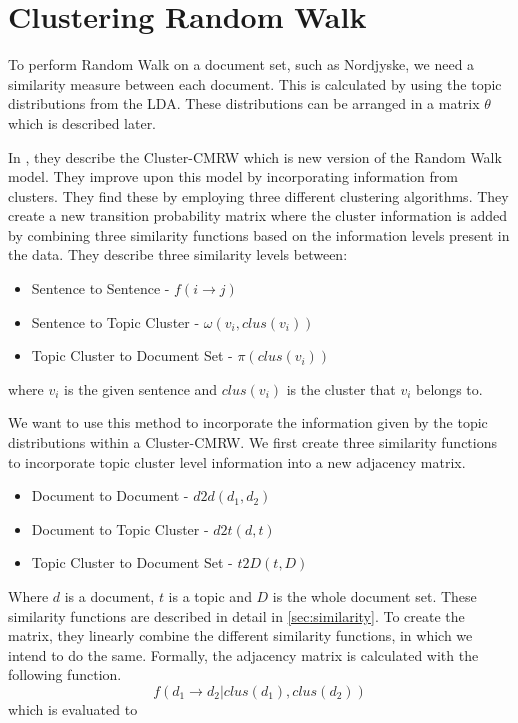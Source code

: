 \section{Clustering Random Walk}
To perform Random Walk on a document set, such as Nordjyske, we need a similarity measure between each document.
This is calculated by using the topic distributions from the \gls{LDA}.
These distributions can be arranged in a matrix $\theta$ which is described later.

In \cite{ClusterPageRank}, they describe the \gls{Cluster-CMRW} which is new version of the Random Walk model. 
They improve upon this model by incorporating information from clusters. 
They find these by employing three different clustering algorithms.
They create a new transition probability matrix where the cluster information is added by combining three similarity functions based on the information levels present in the data.
They describe three similarity levels between:
\begin{itemize}
    \item Sentence to Sentence - $f(i \rightarrow j)$
    \item Sentence to Topic Cluster - $\omega(v_i, clus(v_i))$
    \item Topic Cluster to Document Set - $\pi(clus(v_i))$
\end{itemize}
where $v_i$ is the given sentence and $clus(v_i)$ is the cluster that $v_i$ belongs to.

We want to use this method to incorporate the information given by the topic distributions within a \gls{Cluster-CMRW}. 
We first create three similarity functions to incorporate topic cluster level information into a new adjacency matrix.
\begin{itemize}
    \item Document to Document - $d2d(d_1, d_2)$
    \item Document to Topic Cluster - $d2t(d,t)$
    \item Topic Cluster to Document Set - $t2D(t, D)$
\end{itemize}

\noindent
Where $d$ is a document, $t$ is a topic and $D$ is the whole document set.
These similarity functions are described in detail in \autoref{sec:similarity}.
To create the matrix, they linearly combine the different similarity functions, in which we intend to do the same.
Formally, the adjacency matrix is calculated with the following function.
$$ f(d_1 \rightarrow d_2 | clus(d_1), clus(d_2)) $$
which is evaluated to 

